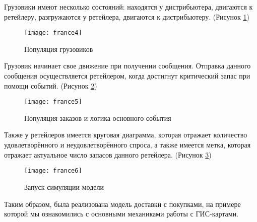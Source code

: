 Грузовики имеют несколько состояний: находятся у дистрибьютера, двигаются к ретейлеру, разгружаются у ретейлера, двигаются к дистрибьютеру. (Рисунок \ref{fig:france4})
\begin{figure}[h]
	\centering \texttt{[image: france4]}
	\caption{Популяция грузовиков}
	\label{fig:france4}
\end{figure}

\newpage

Грузовик начинает свое движение при получении сообщения. Отправка данного сообщения осуществляется ретейлером, когда достигнут критический запас при помощи событий. (Рисунок \ref{fig:france5})
\begin{figure}[h]
	\centering \texttt{[image: france5]}
	\caption{Популяция заказов и логика основного события}
	\label{fig:france5}
\end{figure}

Также у ретейлеров имеется круговая диаграмма, которая отражает количество удовлетворённого и неудовлетворённого спроса, а также имеется метка, которая отражает актуальное число запасов данного ретейлера. (Рисунок \ref{fig:france6})
\begin{figure}[h]
	\centering \texttt{[image: france6]}
	\caption{Запуск симуляции модели}
	\label{fig:france6}
\end{figure}

Таким образом, была реализована модель доставки с покупками, на примере которой мы ознакомились с основными механиками работы с ГИС-картами.